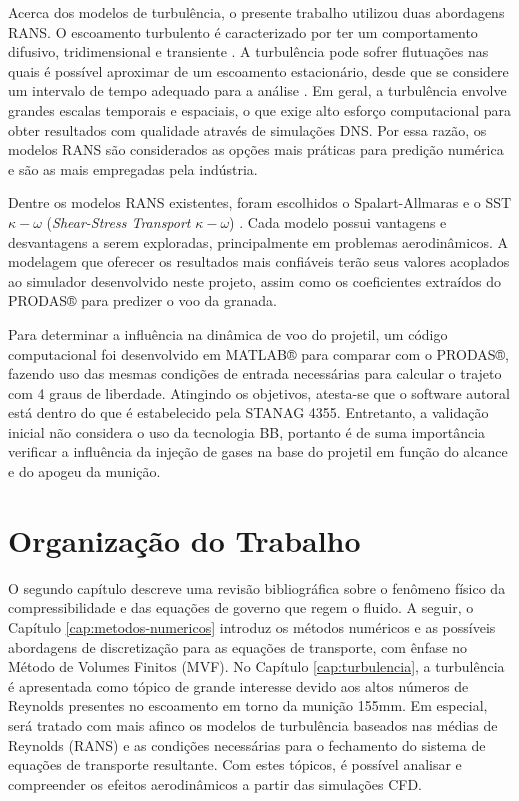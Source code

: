 Acerca dos modelos de turbulência, o presente trabalho utilizou duas abordagens RANS. O escoamento turbulento é caracterizado por ter um comportamento difusivo, tridimensional e transiente \cite{Rezende2009}. A turbulência pode sofrer flutuações nas quais é possível aproximar de um escoamento estacionário, desde que se considere um intervalo de tempo adequado para a análise \cite{Souza2011,SilveiraNeto2002}. Em geral, a turbulência envolve grandes escalas temporais e espaciais, o que exige alto esforço computacional para obter resultados com qualidade através de simulações DNS. Por essa razão, os modelos RANS são considerados as opções mais práticas para predição numérica e são as mais empregadas pela indústria.
	
Dentre os modelos RANS existentes, foram escolhidos o Spalart-Allmaras \cite{Spalart1992} e o SST $\kappa-\omega$ (\textit{Shear-Stress Transport} $\kappa-\omega$) \cite{Menter1994TwoequationET,Menter2009}. Cada modelo possui vantagens e desvantagens a serem exploradas, principalmente em problemas aerodinâmicos. A modelagem que oferecer os resultados mais confiáveis terão seus valores acoplados ao simulador desenvolvido neste projeto, assim como os coeficientes extraídos do PRODAS® para predizer o voo da granada.

Para determinar a influência na dinâmica de voo do projetil, um código computacional foi desenvolvido em MATLAB® para comparar com o PRODAS®, fazendo uso das mesmas condições de entrada necessárias para calcular o trajeto com 4 graus de liberdade. Atingindo os objetivos, atesta-se que o software autoral está dentro do que é estabelecido pela STANAG 4355. Entretanto, a validação inicial não considera o uso da tecnologia BB, portanto é de suma importância verificar a influência da injeção de gases na base do projetil em função do alcance e do apogeu da munição. 

\section{Organização do Trabalho}

O segundo capítulo descreve uma revisão bibliográfica sobre o fenômeno físico da compressibilidade e das equações de governo que regem o fluido. A seguir, o Capítulo \ref{cap:metodos-numericos} introduz os métodos numéricos e as possíveis abordagens de discretização para as equações de transporte, com ênfase no Método de Volumes Finitos (MVF). No Capítulo \ref{cap:turbulencia}, a turbulência é apresentada como tópico de grande interesse devido aos altos números de Reynolds presentes no escoamento em torno da munição 155mm. Em especial, será tratado com mais afinco os modelos de turbulência baseados nas médias de Reynolds (RANS) e as condições necessárias para o fechamento do sistema de equações de transporte resultante. Com estes tópicos, é possível analisar e compreender os efeitos aerodinâmicos a partir das simulações CFD.

